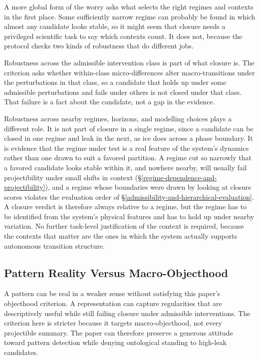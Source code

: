 A more global form of the worry asks what selects the right regimes and
contexts in the first place. Some sufficiently narrow regime can
probably be found in which almost any candidate looks stable, so it
might seem that closure needs a privileged scientific task to say which
contexts count. It does not, because the protocol checks two kinds of
robustness that do different jobs.

Robustness across the admissible intervention class is part of what
closure is. The criterion asks whether within-class micro-differences
alter macro-transitions under the perturbations in that class, so a
candidate that holds up under some admissible perturbations and fails
under others is not closed under that class. That failure is a fact
about the candidate, not a gap in the evidence.

Robustness across nearby regimes, horizons, and modelling choices plays
a different role. It is not part of closure in a single regime, since a
candidate can be closed in one regime and leak in the next, as ice does
across a phase boundary. It is evidence that the regime under test is a
real feature of the system's dynamics rather than one drawn to suit
a favored partition. A regime cut so narrowly that a favored candidate
looks stable within it, and nowhere nearby, will usually fail
projectibility under small shifts in context
(\S\ref{regime-dependence-and-projectibility}), and a regime whose
boundaries were drawn by looking at closure scores violates the
evaluation order of \S\ref{admissibility-and-hierarchical-evaluation}.
A closure verdict is therefore always relative to a regime, but the
regime has to be identified from the system's physical features and has
to hold up under nearby variation. No further task-level justification
of the context is required, because the contexts that matter are the
ones in which the system actually supports autonomous transition
structure.

\subsection{Pattern Reality Versus
	Macro-Objecthood}\label{pattern-reality-versus-macro-objecthood}

A pattern can be real in a weaker sense without satisfying this
paper's objecthood criterion. A representation can capture regularities
that are descriptively useful while still failing closure under
admissible interventions. The criterion here is stricter because it
targets macro-objecthood, not every projectible summary. The paper can therefore
preserve a generous attitude toward pattern detection while denying
ontological standing to high-leak candidates.

